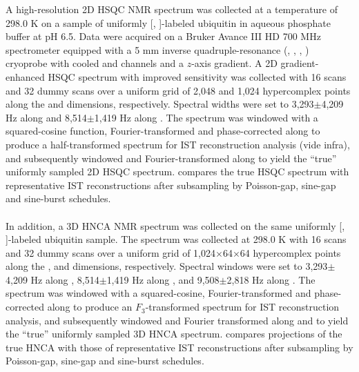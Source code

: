 \begin{doublespace}
A high-resolution 2D \hnnmr{} HSQC NMR spectrum was collected at a temperature
of 298.0 K on a sample of uniformly [\nnmr{}, \cnmr{}]-labeled ubiquitin in
aqueous phosphate buffer at pH 6.5. Data were acquired on a Bruker Avance
III HD 700 MHz spectrometer equipped with a 5 mm inverse quadruple-resonance
(\hnmr{}, \cnmr{}, \nnmr{}, \pnmr{}) cryoprobe with cooled \hnmr{} and \cnmr{}
channels and a $z$-axis gradient. A 2D gradient-enhanced \hnnmr{} HSQC spectrum
with improved sensitivity \cite{kay:jacs1992,palmer:jmr1991} was collected with
16 scans and 32 dummy scans over a uniform grid of 2,048 and 1,024 hypercomplex
points along the \hnmr{} and \nnmr{} dimensions, respectively. Spectral widths
were set to 3,293$\pm$4,209 Hz along \hnmr{} and 8,514$\pm$1,419 Hz along
\nnmr{}. The spectrum was windowed with a squared-cosine function,
Fourier-transformed and phase-corrected along \hnmr{} to produce a
half-transformed spectrum for IST reconstruction analysis (vide infra),
and subsequently windowed and Fourier-transformed along \nnmr{} to yield the
``true'' uniformly sampled 2D \hnnmr{} HSQC spectrum.
 compares the true HSQC spectrum with
representative IST reconstructions after subsampling by
Poisson-gap, sine-gap and sine-burst schedules.
\\\\
In addition, a 3D HNCA NMR spectrum was collected on the same uniformly
[\nnmr{}, \cnmr{}]-labeled ubiquitin sample. The spectrum was collected at
298.0 K with 16 scans and 32 dummy scans over a uniform grid of
1,024$\times$64$\times$64 hypercomplex points along the \hnmr{}, \nnmr{} and
\cnmr{} dimensions, respectively. Spectral windows were set to
3,293$\pm$4,209 Hz along \hnmr{}, 8,514$\pm$1,419 Hz along \nnmr{}, and
9,508$\pm$2,818 Hz along \cnmr{}. The spectrum was windowed with a
squared-cosine, Fourier-transformed and phase-corrected along \hnmr{} to
produce an $F_3$-transformed spectrum for IST reconstruction analysis, and
subsequently windowed and Fourier transformed along \nnmr{} and \cnmr{} to
yield the ``true'' uniformly sampled 3D HNCA spectrum.
 compares \hcnmr{} projections of the true HNCA with
those of representative IST reconstructions after subsampling by Poisson-gap,
sine-gap and sine-burst schedules.
\end{doublespace}

